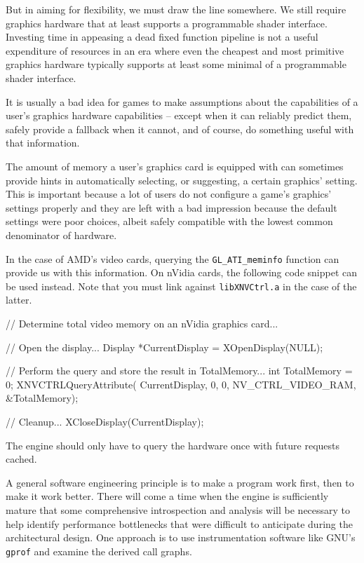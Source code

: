 But in aiming for flexibility, we must draw the line somewhere. We still require graphics hardware that at least supports a programmable shader interface. Investing time in appeasing a dead fixed function pipeline is not a useful expenditure of resources in an era where even the cheapest and most primitive graphics hardware typically supports at least some minimal of a programmable shader interface.

It is usually a bad idea for games to make assumptions about the capabilities of a user's graphics hardware capabilities -- except when it can reliably predict them, safely provide a fallback when it cannot, and of course, do something useful with that information. 

The amount of memory a user's graphics card is equipped with can sometimes provide hints in automatically selecting, or suggesting, a certain graphics' setting. This is important because a lot of users do not configure a game's graphics' settings properly and they are left with a bad impression because the default settings were poor choices, albeit safely compatible with the lowest common denominator of hardware.

In the case of AMD's video cards, querying the {\tt GL_ATI_meminfo} function can provide us with this information. On nVidia cards, the following code snippet can be used instead. Note that you must link against {\tt libXNVCtrl.a} in the case of the latter.

\startCodeExample
// Determine total video memory on an nVidia graphics card...

    // Open the display...
    Display *CurrentDisplay = XOpenDisplay(NULL);

    // Perform the query and store the result in TotalMemory...
    int TotalMemory = 0;
    XNVCTRLQueryAttribute(
        CurrentDisplay, 0, 0, NV_CTRL_VIDEO_RAM, &TotalMemory);
    
    // Cleanup...
    XCloseDisplay(CurrentDisplay);
\stopCodeExample

The engine should only have to query the hardware once with future requests cached.

A general software engineering principle is to make a program work first, then to make it work better. There will come a time when the engine is sufficiently mature that some comprehensive introspection and analysis will be necessary to help identify performance bottlenecks that were difficult to anticipate during the architectural design. One approach is to use instrumentation software like GNU's {\tt gprof} and examine the derived call graphs.

